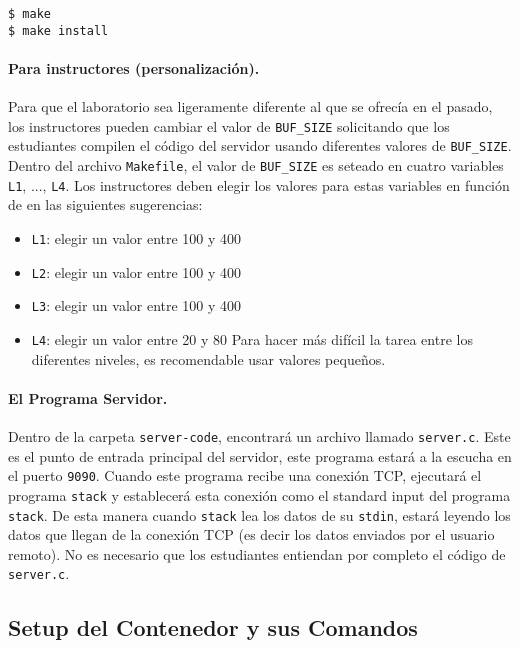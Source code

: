 \begin{lstlisting}
$ make
$ make install
\end{lstlisting}
 

\paragraph{Para instructores (personalización).}
Para que el laboratorio sea ligeramente diferente al que se ofrecía en el pasado,
los instructores pueden cambiar el valor de \texttt{BUF\_SIZE} solicitando
que los estudiantes compilen el código del servidor usando diferentes valores de \texttt {BUF\_SIZE}.
Dentro del archivo \texttt{Makefile}, el valor de \texttt{BUF\_SIZE} es seteado en 
cuatro variables \texttt{L1}, ..., \texttt{L4}.
Los instructores deben elegir los valores para estas variables en función de
en las siguientes sugerencias:

\begin{itemize}[noitemsep]
\item \texttt{L1}: elegir un valor entre 100 y 400
\item \texttt{L2}: elegir un valor entre 100 y 400
\item \texttt{L3}: elegir un valor entre 100 y 400
\item \texttt{L4}: elegir un valor entre 20 y 80
Para hacer más difícil la tarea entre los diferentes niveles, es recomendable usar valores pequeños.
\end{itemize}



\paragraph{El Programa Servidor.} 
Dentro de la carpeta \texttt{server-code}, encontrará un archivo llamado \texttt{server.c}.
Este es el punto de entrada principal del servidor, este programa estará a la escucha en el puerto \texttt{9090}. 
Cuando este programa recibe una conexión TCP, ejecutará el programa \texttt{stack} y establecerá esta conexión como el standard input del programa \texttt{stack}. De esta manera cuando \texttt{stack} lea los datos de su \texttt{stdin}, estará leyendo los datos que llegan de la conexión TCP (es decir los datos enviados por el usuario remoto). No es necesario que los estudiantes entiendan por completo el código de \texttt{server.c}.


\subsection{Setup del Contenedor y sus Comandos}

